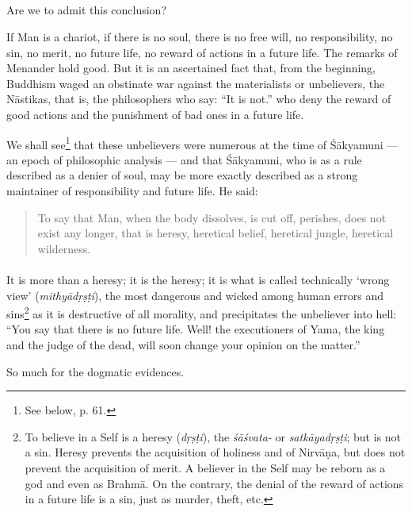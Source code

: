 \documentclass[a4paper, 11pt, oneside, english, landscape]{article}
\begin{document}
\subsection{}
\paragraph{}
Are we to admit this conclusion?

If Man is a chariot, if there is no soul, there is no free will, no responsibility, no sin, no merit, no future life, no reward of actions in a future life. The remarks of Menander hold good. But it is an ascertained fact that, from the beginning, Buddhism waged an obstinate war against the materialists or unbelievers, the Nāstikas, that is, the philosophers who say: ``It is not.'' who deny the reward of good actions and the punishment of bad ones in a future life.

We shall see\footnote{See below, p. 61.} that these unbelievers were numerous at the time of Śākyamuni --- an epoch of philosophic analysis --- and that Śākyamuni, who is as a rule described as a denier of soul, may be more exactly described as a strong maintainer of responsibility and future life. He said:
\begin{quotation}
\small
To say that Man, when the body dissolves, is cut off, perishes, does not exist any longer, that is heresy, heretical belief, heretical jungle, heretical wilderness.
\end{quotation}
\paragraph{}
It is more than a heresy; it is the heresy; it is what is called technically `wrong view' (\emph{mithyādṛṣṭi}), the most dangerous and wicked among human errors and sins\footnote{To believe in a Self is a heresy (\emph{dṛṣṭi}), the \emph{śāśvata-} or \emph{satkāyadṛṣṭi}; but is not a sin. Heresy prevents the acquisition of holiness and of Nirvāṇa, but does not prevent the acquisition of merit. A believer in the Self may be reborn as a god and even as Brahmā. On the contrary, the denial of the reward of actions in a future life is a sin, just as murder, theft, etc.} as it is destructive of all morality, and precipitates the unbeliever into hell: ``You say that there is no future life. Well! the executioners of Yama, the king and the judge of the dead, will soon change your opinion on the matter.''

So much for the dogmatic evidences.
\end{document}
